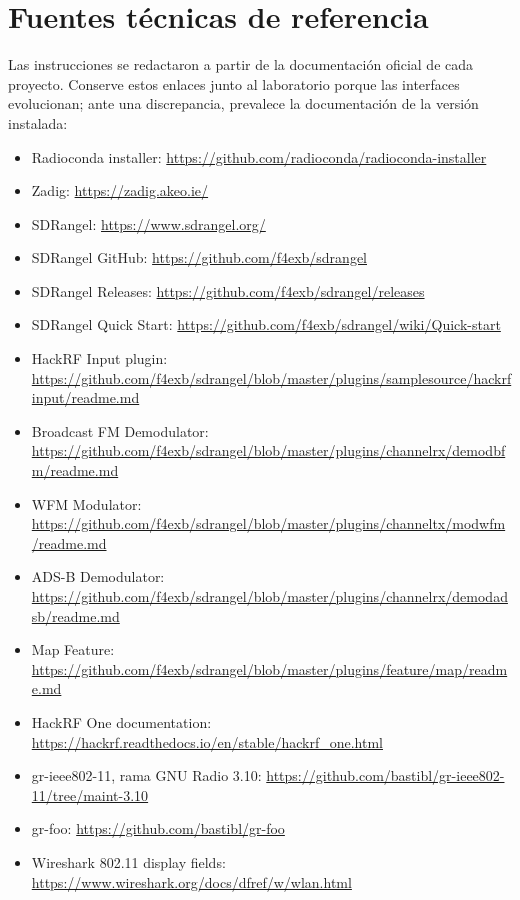 \section{Fuentes técnicas de referencia}

Las instrucciones se redactaron a partir de la documentación oficial de cada proyecto. Conserve estos enlaces junto al laboratorio porque las interfaces evolucionan; ante una discrepancia, prevalece la documentación de la versión instalada:

\begin{itemize}
    \item Radioconda installer: \url{https://github.com/radioconda/radioconda-installer}
    \item Zadig: \url{https://zadig.akeo.ie/}
    \item SDRangel: \url{https://www.sdrangel.org/}
    \item SDRangel GitHub: \url{https://github.com/f4exb/sdrangel}
    \item SDRangel Releases: \url{https://github.com/f4exb/sdrangel/releases}
    \item SDRangel Quick Start: \url{https://github.com/f4exb/sdrangel/wiki/Quick-start}
    \item HackRF Input plugin: \url{https://github.com/f4exb/sdrangel/blob/master/plugins/samplesource/hackrfinput/readme.md}
    \item Broadcast FM Demodulator: \url{https://github.com/f4exb/sdrangel/blob/master/plugins/channelrx/demodbfm/readme.md}
    \item WFM Modulator: \url{https://github.com/f4exb/sdrangel/blob/master/plugins/channeltx/modwfm/readme.md}
    \item ADS-B Demodulator: \url{https://github.com/f4exb/sdrangel/blob/master/plugins/channelrx/demodadsb/readme.md}
    \item Map Feature: \url{https://github.com/f4exb/sdrangel/blob/master/plugins/feature/map/readme.md}
    \item HackRF One documentation: \url{https://hackrf.readthedocs.io/en/stable/hackrf_one.html}
    \item gr-ieee802-11, rama GNU Radio 3.10: \url{https://github.com/bastibl/gr-ieee802-11/tree/maint-3.10}
    \item gr-foo: \url{https://github.com/bastibl/gr-foo}
    \item Wireshark 802.11 display fields: \url{https://www.wireshark.org/docs/dfref/w/wlan.html}
\end{itemize}

